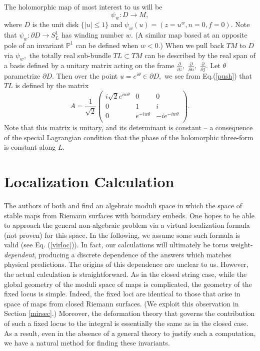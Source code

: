 \documentclass[a4paper,11pt]{article}
\newcommand{\PP}{{\mathbb{P}}}
\begin{document}
The holomorphic map of most
interest to us will be
\begin{equation}
\label{psieq}
\psi_w: D\rightarrow M,
\end{equation}
where $D$ is the unit disk $\{|u|\leq 1\}$ and $\psi_w(u)=
(z = u^w,n = 0,f = 0).$ 
Note that $\psi_w: \partial D \rightarrow S^1_L$
has winding number $w$.  (A similar map based at an
opposite pole of an invariant $\PP^1$ can be defined
when $w<0.$)
When we pull back $TM$ to $D$ via $\psi_w,$ the
totally real sub-bundle
$TL\subset TM$ can be described by the real span of a basis
defined by a unitary matrix acting on the frame
$\frac{\partial}{\partial z},$
$\frac{\partial}{\partial n},$
$\frac{\partial}{\partial f}.$
Let $\theta$ parametrize $\partial D.$
Then over the point $u = e^{i\theta}\in \partial D,$
we see from Eq.\!\!\!(\ref{push}) that
$TL$ is defined by the matrix
\begin{equation}
\label{Amatrix}
A = \frac{1}{\sqrt{2}}\begin{pmatrix}
i\sqrt{2}e^{iw\theta}&0&0\\
0&1&i\\
0&e^{-iw\theta}&-ie^{-iw\theta}\\
\end{pmatrix}.
\end{equation}
Note that this matrix is unitary, and its determinant is constant --
a consequence of the special Lagrangian condition
that the phase of the holomorphic three-form is constant along $L.$

\section{Localization Calculation}
\label{weights}

The authors of both \cite{KL} and \cite{LS} find an
algebraic moduli space in which the space of stable
maps from Riemann surfaces with boundary embeds.
One hopes to be able to approach the general
non-algebraic problem via a virtual localization
formula (not proven) for this space.
In the following, we assume some such formula is
valid (see Eq.\!\!\! (\ref{virloc})).
In fact, our calculations will ultimately be
torus weight-{\em dependent}, producing a discrete
dependence of the answers which matches
physical predictions.
The origins of this dependence are unclear to us.
However, the actual calculation is straightforward.
As in the closed string case, while the global geometry
of the moduli space of maps is complicated, the
geometry of the fixed locus is simple.  Indeed,
the fixed loci are identical to those that arise
in space of maps from closed Riemann surfaces.
(We exploit this observation in Section \ref{mirsec}.)
Moreover, the deformation theory that governs
the contribution of such a fixed locus to
the integral is essentially the same
as in the closed case.  As a result, even
in the absence of a general theory to justify
such a computation, we have a natural method
for finding these invariants.
\end{document}
